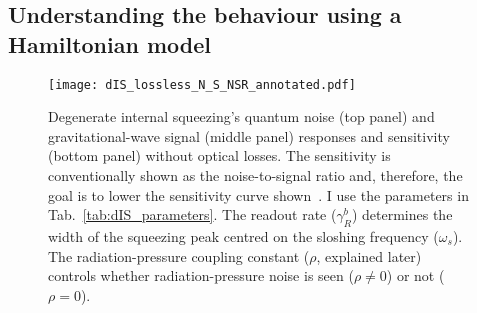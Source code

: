 \begin{comment}
	Inspecting $\text{T}\begin{bsmallmatrix}1 \\1\end{bsmallmatrix}$, i.e.\ the vector of signal transfer functions to each quadrature, shows that there are two terms: (1) rotates between the quadratures with the pump phase and (2) stays in the second quadrature and never vanishes with the pump phase\jam{(is it worth showing this?)}. I consider measuring the second quadrature at the photodetector since the signal is always there~\footnote{This does not mean that it is necessarily optimal to do so since the profile of the noise between the two quadratures is different to the signal, but it will suffice here~\cite{}.\jam{(What happens if I use $\phi=\pi$ and observe the first quadrature instead?)}}, and therefore the sensitivity ($\sqrt{S_h}$ is the noise-to-signal ratio) is
	\begin{equation}
	S_h = \frac{(\text{S}_X)_{2,2}}{\abs{(\text{T}\begin{bsmallmatrix}1 \\1\end{bsmallmatrix})_2}^2}.
	\end{equation}
\end{comment}


\subsection{Understanding the behaviour using a Hamiltonian model}
\label{sec:dIS_results}

\begin{figure}
	\centering
	\texttt{[image: dIS\_lossless\_N\_S\_NSR\_annotated.pdf]}
	\caption{ Degenerate internal squeezing's quantum noise (top panel) and gravitational-wave signal (middle panel) responses and sensitivity (bottom panel) without optical losses. The sensitivity is conventionally shown as the noise-to-signal ratio and, therefore, the goal is to lower the sensitivity curve shown~\cite{}. I use the parameters in Tab.~\ref{tab:dIS_parameters}. The readout rate ($\gamma^b_R$) determines the width of the squeezing peak centred on the sloshing frequency ($\omega_s$). %
	The radiation-pressure coupling constant ($\rho$, explained later) controls whether radiation-pressure noise is seen ($\rho\neq0$) or not ($\rho=0$).
	}
	\label{fig:dIS_sensitivity}
\end{figure}

